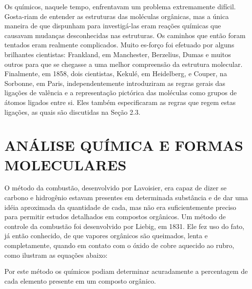 \begin{tightcenter}
    \chemnameinit{}
    \qquad\qquad
    \chemnameinit{}
\end{tightcenter}

Os químicos, naquele tempo, enfrentavam um problema extremamente difícil. Gosta-riam de entender as estruturas das moléculas orgânicas, mas a única maneira de que dispunham para investigá-las eram reações químicas que causavam mudanças desconhecidas nas estruturas. Os caminhos que então foram tentados eram realmente complicados. Muito es-forço foi efetuado por alguns brilhantes cientistas: Frankland, em Manchester, Berzelius, Dumas e muitos outros para que se chegasse a uma melhor compreensão da estrutura molecular. Finalmente, em 1858, dois cientistas, Kekulé, em Heidelberg, e Couper, na Sorbonne, em Paris, independentemente introduziram as regras gerais das ligações de valência e a representação pictórica das moléculas como grupos de átomos ligados entre si. Eles também especificaram as regras que regem estas ligações, as quais são discutidas na Seção 2.3. 

\section{ANÁLISE QUÍMICA E FORMAS MOLECULARES}

O método da combustão, desenvolvido por Lavoisier, era capaz de dizer se carbono e hidrogênio estavam presentes em determinada substância e de dar uma idéia aproximada da quantidade de cada, mas não era suficientemente preciso para permitir estudos detalhados em compostos orgânicos. Um método de controle da combustão foi desenvolvido por Liebig, em 1831. Ele fez uso do fato, já então conhecido, de que vapores orgânicos são queimados, lenta e completamente, quando em contato com o óxido de cobre aquecido ao rubro, como ilustram as equações abaixo: 

\begin{tightcenter}
    
\end{tightcenter}

Por este método os químicos podiam determinar acuradamente a percentagem de cada elemento presente em um composto orgânico. 

